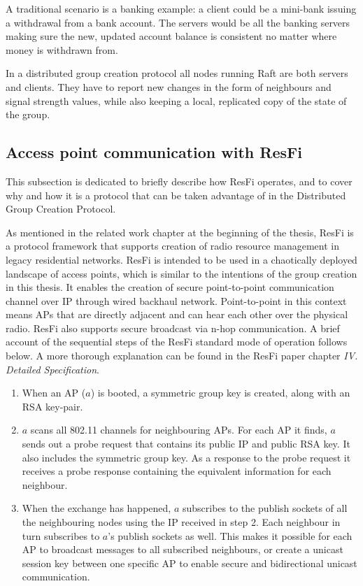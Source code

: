 A traditional scenario is a banking example: a client could be a mini-bank issuing a withdrawal from a bank account. The servers would be all the banking servers making sure the new,
updated account balance is consistent no matter where money is withdrawn from. 

In a distributed group creation protocol all nodes running Raft are both servers and clients. They have to report new changes in the form of neighbours and signal strength values,
while also keeping a local, replicated copy of the state of the group.

\subsection{Access point communication with ResFi}
This subsection is dedicated to briefly describe how ResFi operates, and to cover why and how it is a protocol that can be taken advantage of in the Distributed Group Creation Protocol. 

As mentioned in the related work chapter at the beginning of the thesis, ResFi is a protocol framework that supports creation of radio resource management in legacy residential networks.
ResFi is intended to be used in a chaotically deployed landscape of access points, which is similar to the intentions of the group creation in this thesis. It enables the creation of secure point-to-point communication channel over IP through wired backhaul network. Point-to-point in this context means APs that are directly adjacent and can hear each other over the physical radio. ResFi also supports secure broadcast via n-hop communication. A brief account of the sequential steps of the ResFi standard mode of operation follows below. A more thorough explanation can be found in the ResFi paper \cite{resfi} chapter \textit{IV. Detailed Specification}.

\begin{enumerate}
	\item When an AP ($a$) is booted, a symmetric group key is created, along with an RSA key-pair. 
	\item $a$ scans all 802.11 channels for neighbouring APs. For each AP it finds, $a$ sends out a probe request that contains its public IP and public RSA key. It also includes
		the symmetric group key. As a response to the probe request it receives a probe response containing the equivalent information for each neighbour. 
	\item When the exchange has happened, $a$ subscribes to the publish sockets of all the neighbouring nodes using the IP received in step 2. Each neighbour in turn subscribes to $a$'s
		publish sockets as well. This makes it possible for each AP to broadcast messages to all subscribed neighbours,
		or create a unicast session key between one specific AP to enable secure and bidirectional unicast communication.
\end{enumerate}

